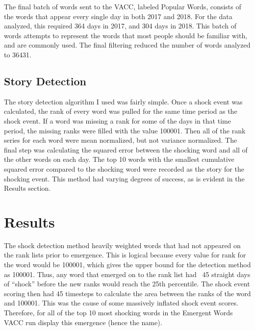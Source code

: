 \documentclass{article}
\begin{document}
The final batch of words sent to the VACC,
labeled Popular Words,
consists of the words that appear every single day in both 2017 and 2018.
For the data analyzed,
this required 364 days in 2017,
and 304 days in 2018.
This batch of words attempts to represent the words that most people should
be familiar with,
and are commonly used.
The final filtering reduced the number of words analyzed to 36431.

\subsection{Story Detection}
The story detection algorithm I used was fairly simple.
Once a shock event was calculated,
the rank of every word was pulled for the same time period as the shock event.
If a word was missing a rank for some of the days in that time period,
the missing ranks were filled with the value 100001.
Then all of the rank series for each word were mean normalized,
but not variance normalized.
The final step was calculating the squared error between the shocking word
and all of the other words on each day.
The top 10 words with the smallest cumulative squared error compared to the
shocking word were recorded as the story for the shocking event.
This method had varying degrees of success,
as is evident in the Results section.

\section{Results}
The shock detection method heavily weighted words that had not appeared on the
rank lists prior to emergence.
This is logical because every value for rank for the word would be 100001,
which gives the upper bound for the detection method as 100001.
Thus,
any word that emerged on to the rank list had ~45 straight days of ``shock''
before the new ranks would reach the 25th percentile.
The shock event scoring then had 45 timesteps to calculate the area between
the ranks of the word and 100001.
This was the cause of some massively inflated shock event scores.
Therefore,
for all of the top 10 most shocking words in the Emergent Words VACC run display this
emergence (hence the name).\par
\end{document}
